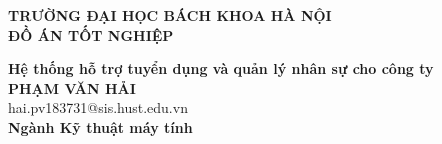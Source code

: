 \documentclass[DoAn.tex]{subfiles}
\begin{document}
\begin{titlepage}
\thispagestyle{empty}
\begin{center}

{\textbf{\large{TRƯỜNG ĐẠI HỌC BÁCH KHOA HÀ NỘI}}}\\[4cm]

{\textbf{\huge{ĐỒ ÁN TỐT NGHIỆP}}}\\[1cm]
{\textbf{\Large{Hệ thống hỗ trợ tuyển dụng và quản lý nhân sự cho công ty}}\\[1cm]

{\textbf{\large{PHẠM VĂN HẢI}}}\\
{\large{hai.pv183731@sis.hust.edu.vn}}\\[0.5cm]

{\textbf{\large{Ngành Kỹ thuật máy tính}}}\\

\vspace{2cm}
\begin{table}[H]
\centering
{}
\end{table}}
\end{center}



\end{titlepage}
\end{document}
